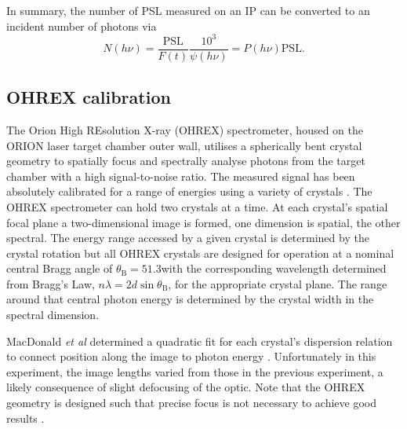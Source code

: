 In summary, the number of PSL measured on an IP can be converted to an incident number of photons via
\begin{equation}
	N(h\nu) = \frac{\mathrm{PSL}}{F(t)}\frac{10^3}{\psi(h\nu)} = P(h\nu) \mathrm{PSL}.
\end{equation}

\subsection{OHREX calibration}
The Orion High REsolution X-ray (OHREX) spectrometer, housed on the ORION laser target chamber outer wall, utilises a spherically bent crystal geometry to spatially focus and spectrally analyse photons from the target chamber \cite{beiersdorferLineshapeSpectroscopyVery2016} with a high signal-to-noise ratio. The measured signal has been absolutely calibrated for a range of energies using a variety of crystals \cite{macdonaldAbsoluteThroughputCalibration2021}. The OHREX spectrometer can hold two crystals at a time. At each crystal's spatial focal plane a two-dimensional image is formed, one dimension is spatial, the other spectral. The energy range accessed by a given crystal is determined by the crystal rotation but all OHREX crystals are designed for operation at a nominal central Bragg angle of $\theta_\mathrm{B} = 51.3$\degree with the corresponding wavelength determined from Bragg's Law, $n\lambda = 2d\sin\theta_\mathrm{B}$, for the appropriate crystal plane. The range around that central photon energy is determined by the crystal width in the spectral dimension.

MacDonald \textit{et al} determined a quadratic fit for each crystal's dispersion relation to connect position along the image to photon energy \cite{macdonaldAbsoluteThroughputCalibration2021}. Unfortunately in this experiment, the image lengths varied from those in the previous experiment, a likely consequence of slight defocusing of the optic. Note that the OHREX geometry is designed such that precise focus is not necessary to achieve good results \cite{beiersdorferLineshapeSpectroscopyVery2016}.

